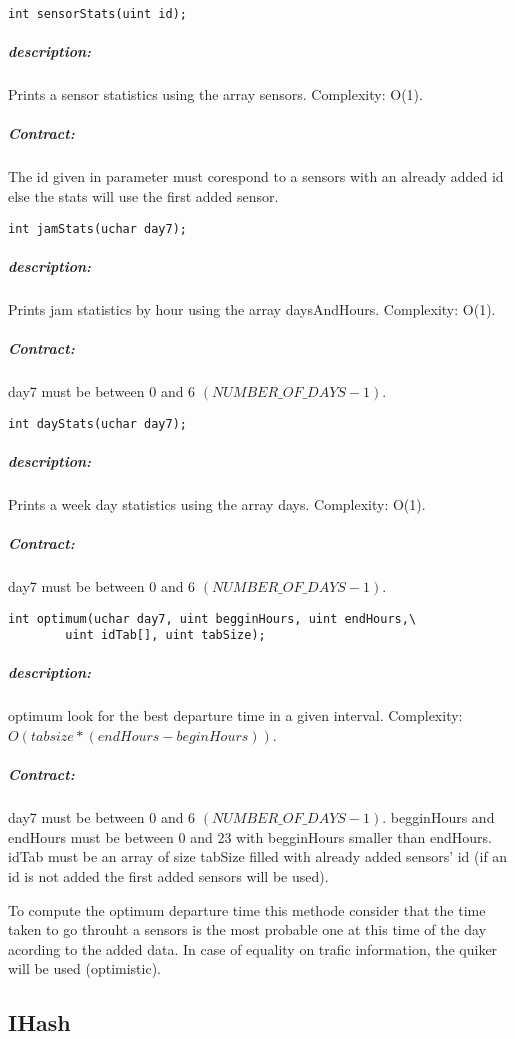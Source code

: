 \documentclass[a4paper, 12pts]{article}
\begin{document}
\begin{lstlisting}
int sensorStats(uint id);
\end{lstlisting}
\subparagraph{description:}
	Prints a sensor statistics using the array sensors. Complexity: O(1).
\subparagraph{Contract:}
	The id given in parameter must corespond to a sensors with an already added id else the stats will use the first added sensor.

\begin{lstlisting}
int jamStats(uchar day7);
\end{lstlisting}
\subparagraph{description:}
	Prints jam statistics by hour using the array daysAndHours. Complexity: O(1).
\subparagraph{Contract:}
	day7 must be between 0 and 6 $(NUMBER\_OF\_DAYS-1)$.
		
\begin{lstlisting}
int dayStats(uchar day7);
\end{lstlisting}
\subparagraph{description:}
	Prints a week day statistics using the array days. Complexity: O(1).
\subparagraph{Contract:}
	day7 must be between 0 and 6 $(NUMBER\_OF\_DAYS-1)$.
		
\begin{lstlisting}
int optimum(uchar day7, uint begginHours, uint endHours,\
		uint idTab[], uint tabSize);
\end{lstlisting}
\subparagraph{description:}
	optimum look for the best departure time in a given interval. Complexity: $O(tabsize * (endHours-beginHours) )$.
\subparagraph{Contract:}
	day7 must be between 0 and 6 $(NUMBER\_OF\_DAYS-1)$. begginHours and endHours must be between 0 and 23 with begginHours smaller than endHours. idTab must be an array of size tabSize filled with already added sensors' id (if an id is not added the first added sensors will be used).
	
	To compute the optimum departure time this methode consider that the time taken to go throuht a sensors is the most probable one at this time of the day acording to the added data. In case of equality on trafic information, the quiker will be used (optimistic).

\subsection{IHash}
\end{document}
